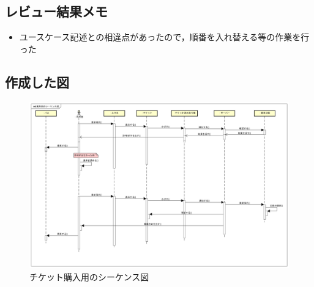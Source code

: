 \documentclass[documentclass]{jsarticle}
\begin{document}
\subsection*{レビュー結果メモ}
\begin{itemize}
  \item ユースケース記述との相違点があったので，順番を入れ替える等の作業を行った
\end{itemize}
\subsection*{作成した図}

\begin{figure}[H]
  \begin{center}
    \includegraphics*[scale=0.3]{figure/6-1.png}
  \end{center}
  \caption{チケット購入用のシーケンス図}
  \label{fig:6-1}
\end{figure}
\end{document}
